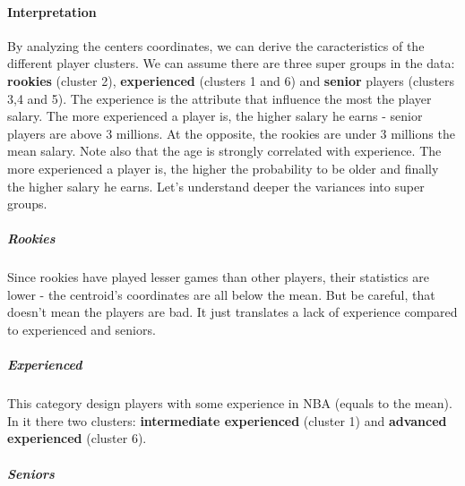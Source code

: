 \paragraph{Interpretation}By analyzing the centers coordinates, we can derive the caracteristics of the different player clusters. We can assume there are three super groups in the data: \textbf{rookies} (cluster 2), \textbf{experienced} (clusters 1 and 6) and \textbf{senior} players (clusters 3,4 and 5). The experience is the attribute that influence the most the player salary. The more experienced a player is, the higher salary he earns - senior players are above $3$ millions. At the opposite, the rookies are under $3$ millions the mean salary. Note also that the age is strongly correlated with experience. The more experienced a player is, the higher the probability to be older and finally the higher salary he earns. Let's understand deeper the variances into super groups.

\subparagraph{Rookies}Since rookies have played lesser games than other players, their statistics are lower - the centroid's coordinates are all below the mean. But be careful, that doesn't mean the players are bad. It just translates a lack of experience compared to experienced and seniors.

\subparagraph{Experienced}This category design players with some experience in NBA (equals to the mean). In it there two clusters: \textbf{intermediate experienced} (cluster 1) and \textbf{advanced experienced} (cluster 6). 

\subparagraph{Seniors}